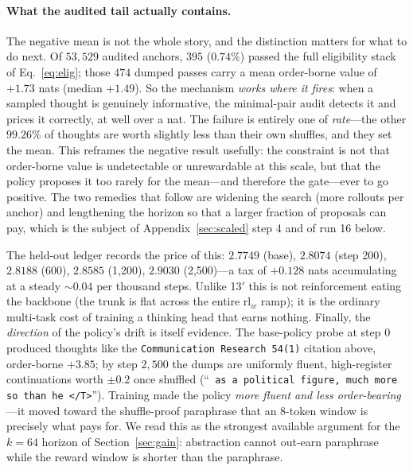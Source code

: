 \documentclass{article} %
\newcommand{\tend}{\texttt{</T>}}
\begin{document}
\paragraph{What the audited tail actually contains.} The negative mean is not the whole story, and the distinction matters for what to do next. Of $53{,}529$ audited anchors, $395$ ($0.74\%$) passed the full eligibility stack of Eq.~\eqref{eq:elig}; those $474$ dumped passes carry a mean order-borne value of $\mathbf{+1.73}$ nats (median $+1.49$). So the mechanism \emph{works where it fires}: when a sampled thought is genuinely informative, the minimal-pair audit detects it and prices it correctly, at well over a nat. The failure is entirely one of \emph{rate}---the other $99.26\%$ of thoughts are worth slightly less than their own shuffles, and they set the mean. This reframes the negative result usefully: the constraint is not that order-borne value is undetectable or unrewardable at this scale, but that the policy proposes it too rarely for the mean---and therefore the gate---ever to go positive. The two remedies that follow are widening the search (more rollouts per anchor) and lengthening the horizon so that a larger fraction of proposals can pay, which is the subject of Appendix~\ref{sec:scaled} step 4 and of run 16 below.

The held-out ledger records the price of this: $2.7749$ (base), $2.8074$ (step 200), $2.8188$ (600), $2.8585$ (1{,}200), $2.9030$ (2{,}500)---a tax of $+0.128$ nats accumulating at a steady ${\sim}0.04$ per thousand steps. Unlike 13$'$ this is not reinforcement eating the backbone (the trunk is flat across the entire $\mathrm{rl}_w$ ramp); it is the ordinary multi-task cost of training a thinking head that earns nothing. Finally, the \emph{direction} of the policy's drift is itself evidence. The base-policy probe at step 0 produced thoughts like the \texttt{Communication Research 54(1)} citation above, order-borne $+3.85$; by step $2{,}500$ the dumps are uniformly fluent, high-register continuations worth $\pm 0.2$ once shuffled (``\texttt{ as a political figure, much more so than he \tend}''). Training made the policy \emph{more fluent and less order-bearing}---it moved toward the shuffle-proof paraphrase that an $8$-token window is precisely what pays for. We read this as the strongest available argument for the $k{=}64$ horizon of Section~\ref{sec:gain}: abstraction cannot out-earn paraphrase while the reward window is shorter than the paraphrase.
\end{document}
